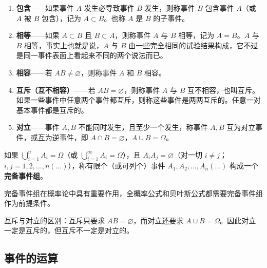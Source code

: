 ﻿\documentclass[lang=cn,11pt]{elegantbook}
\begin{document}
\begin{enumerate}
    \item \textbf{包含}——如果事件 \(A\) 发生必导致事件 \(B\) 发生，则称事件 \(B\) 包含事件 \(A\)（或 \(A\) 被 \(B\) 包含），记为 \(A \subset B\)。也称 \(A\) 是 \(B\) 的子事件。
    \item \textbf{相等}——如果 \(A \subset B\) 且 \(B \subset A\)，则称事件 \(A\) 与 \(B\) 相等，记为 \(A = B\)。\(A\) 与 \(B\) 相等，事实上也就是说，\(A\) 与 \(B\) 由一些完全相同的试验结果构成，它不过是同一事件表面上看起来不同的两个说法而已。
    \item \textbf{相容}——若 \(AB \neq \varnothing\)，则称事件 \(A\) 和 \(B\) 相容。
    \item \textbf{互斥（互不相容）}——若 \(AB = \varnothing\)，则称事件 \(A\) 与 \(B\) 互不相容，也叫互斥。如果一些事件中任意两个事件都互斥，则称这些事件是两两互斥的。任意一对基本事件都是互斥的。
    \item \textbf{对立}——事件 \(A, B\) 不能同时发生，且至少一个发生，称事件 \(A, B\) 互为对立事件，或互为逆事件，即 \(A \cap B = \varnothing\)，\(A \cup B = \Omega\)。
\end{enumerate}

\begin{definition}[完备事件组] \label{def:complete-event-group}
如果 \(\bigcup_{i=1}^{n} A_i = \Omega\)（或 \(\bigcup_{i=1}^{\infty} A_i = \Omega\)），且 \(A_i A_j = \varnothing\)（对一切 \(i \neq j\)；\(i, j = 1, 2, \dots, n(\dots)\)），称有限个（或可列个）事件 \(A_1, A_2, \dots, A_n(\dots)\) 构成一个\textbf{完备事件组}。
\end{definition}

完备事件组在概率论中具有重要作用，全概率公式和贝叶斯公式都需要完备事件组作为前提条件。

\begin{note}
互斥与对立的区别：互斥只要求 \(AB = \varnothing\)，而对立还要求 \(A \cup B = \Omega\)。因此对立一定是互斥的，但互斥不一定是对立的。
\end{note}

\subsection{事件的运算}
\end{document}
